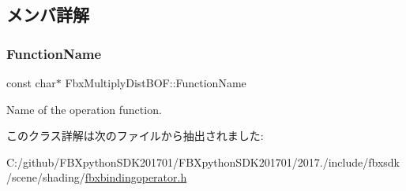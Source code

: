 \subsection{メンバ詳解}
\mbox{\label{class_fbx_multiply_dist_b_o_f_a94b148cde29c7d50de35d8da207ecf6a}} 
\subsubsection{\texorpdfstring{Function\+Name}{FunctionName}}
{\footnotesize\ttfamily const char$\ast$ Fbx\+Multiply\+Dist\+B\+O\+F\+::\+Function\+Name\hspace{0.3cm}{\ttfamily [static]}}



Name of the operation function. 



このクラス詳解は次のファイルから抽出されました\+:\begin{DoxyCompactItemize}
\item 
C\+:/github/\+F\+B\+Xpython\+S\+D\+K201701/\+F\+B\+Xpython\+S\+D\+K201701/2017./include/fbxsdk/scene/shading/\hyperlink{fbxbindingoperator_8h}{fbxbindingoperator.\+h}\end{DoxyCompactItemize}
